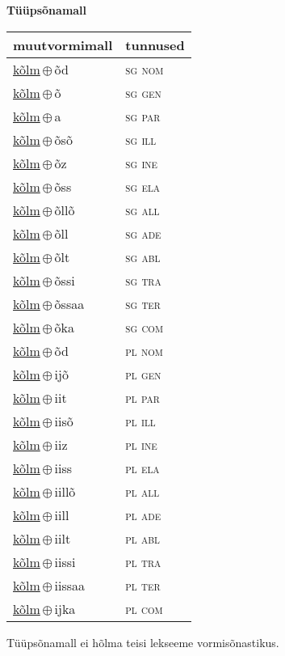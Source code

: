 

\vspace{3.5em}
\noindent \begin{minipage}{\textwidth}
\noindent \textbf{Tüüpsõnamall \,}\\

\begin{sideways}
\begin{tabular}{l l}
muutvormimall & tunnused \\
\hline
\underline{kõlm}\,$\oplus$\,õd & \textsc{ sg nom } \\
\underline{kõlm}\,$\oplus$\,õ & \textsc{ sg gen } \\
\underline{kõlm}\,$\oplus$\,a & \textsc{ sg par } \\
\underline{kõlm}\,$\oplus$\,õsõ & \textsc{ sg ill } \\
\underline{kõlm}\,$\oplus$\,õz & \textsc{ sg ine } \\
\underline{kõlm}\,$\oplus$\,õss & \textsc{ sg ela } \\
\underline{kõlm}\,$\oplus$\,õllõ & \textsc{ sg all } \\
\underline{kõlm}\,$\oplus$\,õll & \textsc{ sg ade } \\
\underline{kõlm}\,$\oplus$\,õlt & \textsc{ sg abl } \\
\underline{kõlm}\,$\oplus$\,õssi & \textsc{ sg tra } \\
\underline{kõlm}\,$\oplus$\,õssaa & \textsc{ sg ter } \\
\underline{kõlm}\,$\oplus$\,õka & \textsc{ sg com } \\
\underline{kõlm}\,$\oplus$\,õd & \textsc{ pl nom } \\
\underline{kõlm}\,$\oplus$\,ijõ & \textsc{ pl gen } \\
\underline{kõlm}\,$\oplus$\,iit & \textsc{ pl par } \\
\underline{kõlm}\,$\oplus$\,iisõ & \textsc{ pl ill } \\
\underline{kõlm}\,$\oplus$\,iiz & \textsc{ pl ine } \\
\underline{kõlm}\,$\oplus$\,iiss & \textsc{ pl ela } \\
\underline{kõlm}\,$\oplus$\,iillõ & \textsc{ pl all } \\
\underline{kõlm}\,$\oplus$\,iill & \textsc{ pl ade } \\
\underline{kõlm}\,$\oplus$\,iilt & \textsc{ pl abl } \\
\underline{kõlm}\,$\oplus$\,iissi & \textsc{ pl tra } \\
\underline{kõlm}\,$\oplus$\,iissaa & \textsc{ pl ter } \\
\underline{kõlm}\,$\oplus$\,ijka & \textsc{ pl com } \\
\end{tabular}
\end{sideways}
\label{tab:tüüpsõnamall-kõlmõd}

\end{minipage}

 
\vspace{1em}
\noindent Tüüpsõnamall  ei hõlma teisi lekseeme vormi\-sõnastikus.
